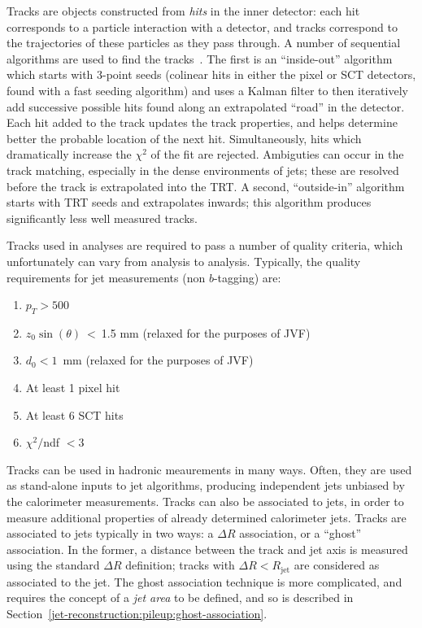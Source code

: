 Tracks are objects constructed from \textit{hits} in the inner detector: each hit corresponds to a particle interaction with a detector, and tracks correspond to the trajectories of these particles as they pass through. A number of sequential algorithms are used to find the tracks~\cite{Track2011,TrackOld}. The first is an ``inside-out'' algorithm which starts with 3-point seeds (colinear hits in either the pixel or SCT detectors, found with a fast seeding algorithm) and uses a Kalman filter to then iteratively add successive possible hits found along an extrapolated ``road'' in the detector. Each hit added to the track updates the track properties, and helps determine better the probable location of the next hit. Simultaneously, hits which dramatically increase the $\chi^2$ of the fit are rejected. Ambiguties can occur in the track matching, especially in the dense environments of jets; these are resolved before the track is extrapolated into the TRT. A second, ``outside-in'' algorithm starts with TRT seeds and extrapolates inwards; this algorithm produces significantly less well measured tracks.

Tracks used in analyses are required to pass a number of quality criteria, which unfortunately can vary from analysis to analysis. Typically, the quality requirements for jet measurements (non $b$-tagging) are:

\begin{enumerate}
\item $p_T > 500$~\MeV
\item $z_0 \sin{(\theta)}~<~$1.5 mm (relaxed for the purposes of JVF)
\item $d_0 < 1$~mm (relaxed for the purposes of JVF)
\item At least 1 pixel hit
\item At least 6 SCT hits
\item $\chi^2/$ndf $< 3$
\end{enumerate}

Tracks can be used in hadronic meaurements in many ways. Often, they are used as stand-alone inputs to jet algorithms, producing independent jets unbiased by the calorimeter measurements. Tracks can also be associated to jets, in order to measure additional properties of already determined calorimeter jets. Tracks are associated to jets typically in two ways: a $\Delta R$ association, or a ``ghost'' association. In the former, a distance between the track and jet axis is measured using the standard $\Delta R$ definition; tracks with $\Delta R < R_\mathrm{jet}$ are considered as associated to the jet. The ghost association technique is more complicated, and requires the concept of a \textit{jet area} to be defined, and so is described in Section~\ref{jet-reconstruction:pileup:ghost-association}.

